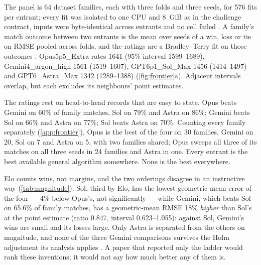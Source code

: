 The panel is 64 dataset families, each with three folds and three seeds, for 576 fits per entrant;
every fit was isolated to one CPU and 8~GiB as in the challenge contract, inputs were byte-identical
across entrants and no cell failed \pre. A family's match outcome between two entrants is the mean
over seeds of a win, loss or tie on RMSE pooled across folds, and the ratings are a Bradley--Terry fit
on those outcomes \citep{bradley1952,elo1978}. Opus5p5\_Extra rates 1641 (95\% interval 1599--1689),
Gemini4\_argon\_high 1561 (1519--1607), GPT6p1\_Sol\_Max 1456 (1414--1497) and GPT6\_Astra\_Max
1342 (1289--1388) (\cref{fig:frontier}a). Adjacent intervals overlap, but each excludes its
neighbours' point estimates.

The ratings rest on head-to-head records that are easy to state. Opus beats Gemini on 60\% of family
matches, Sol on 79\% and Astra on 86\%; Gemini beats Sol on 66\% and Astra on 77\%; Sol beats Astra
on 70\%. Counting every family separately (\cref{app:frontier}), Opus is the best of the four on 30
families, Gemini on 20, Sol on 7 and Astra on 5, with two families shared; Opus sweeps all three of
its matches on all three seeds in 24 families and Astra in one. Every entrant is the best available
general algorithm somewhere. None is the best everywhere.

Elo counts wins, not margins, and the two orderings disagree in an instructive way
(\cref{tab:magnitude}). Sol, third by Elo, has the lowest geometric-mean error of the four --- 4\%
below Opus's, not significantly --- while Gemini, which beats Sol on 65.6\% of family matches, has a
geometric-mean RMSE 18\% \emph{higher} than Sol's at the point estimate (ratio 0.847, interval
0.623--1.055): against Sol, Gemini's wins are small and its losses large. Only Astra is separated
from the others on magnitude, and none of the three Gemini comparisons survives the Holm adjustment
its analysis applies \citep{holm1979}. A paper that reported only the ladder would
rank these inventions; it would not say how much better any of them is.

